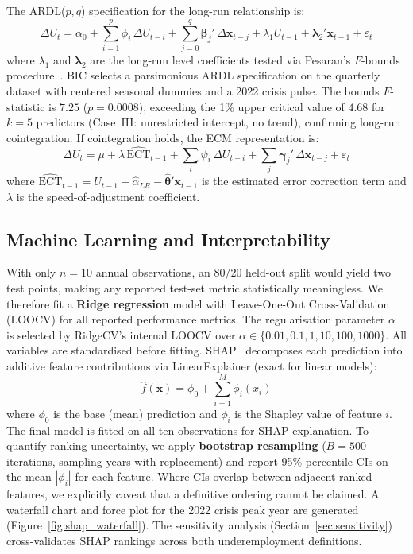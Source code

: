 \documentclass[sigconf]{acmart}
\begin{document}
The ARDL($p,q$) specification for the long-run relationship is:
%
\begin{equation}
  \Delta U_t = \alpha_0
    + \sum_{i=1}^{p}\phi_i\,\Delta U_{t-i}
    + \sum_{j=0}^{q}\boldsymbol{\beta}_j'\,\Delta\mathbf{x}_{t-j}
    + \lambda_1 U_{t-1}
    + \boldsymbol{\lambda}_2'\mathbf{x}_{t-1}
    + \varepsilon_t
  \label{eq:ardl}
\end{equation}
%
where $\lambda_1$ and $\boldsymbol{\lambda}_2$ are the long-run level
coefficients tested via Pesaran's $F$-bounds procedure~\cite{pesaran2001}.
BIC selects a parsimonious ARDL specification on the quarterly dataset
with centered seasonal dummies and a 2022 crisis pulse. The bounds
$F$-statistic is $7.25$ ($p{=}0.0008$),
exceeding the 1\% upper critical value of $4.68$ for $k{=}5$ predictors
(Case~III: unrestricted intercept, no trend), confirming long-run
cointegration. If cointegration holds, the ECM representation is:
%
\begin{equation}
  \Delta U_t = \mu + \lambda\,\widehat{\text{ECT}}_{t-1}
    + \sum_{i}\psi_i\,\Delta U_{t-i}
    + \sum_{j}\boldsymbol{\gamma}_j'\,\Delta\mathbf{x}_{t-j}
    + \varepsilon_t
  \label{eq:ecm}
\end{equation}
%
where $\widehat{\text{ECT}}_{t-1} = U_{t-1} - \hat\alpha_{LR}
- \hat{\boldsymbol{\theta}}'\mathbf{x}_{t-1}$ is the estimated error
correction term and $\lambda$ is the speed-of-adjustment coefficient.

\subsection{Machine Learning and Interpretability}

With only $n{=}10$ annual observations, an 80/20 held-out split would
yield two test points, making any reported test-set metric statistically
meaningless. We therefore fit a \textbf{Ridge regression} model with
Leave-One-Out Cross-Validation (LOOCV) for all reported performance
metrics. The regularisation parameter $\alpha$ is selected by
RidgeCV's internal LOOCV over $\alpha \in \{0.01, 0.1, 1, 10, 100, 1000\}$.
All variables are standardised before fitting. SHAP~\cite{lundberg2017unified}
decomposes each prediction into additive feature contributions via
LinearExplainer (exact for linear models):
%
\begin{equation}
  \hat{f}(\mathbf{x}) = \phi_0 + \sum_{i=1}^{M} \phi_i(x_i)
  \label{eq:shap}
\end{equation}
%
where $\phi_0$ is the base (mean) prediction and $\phi_i$ is the Shapley
value of feature $i$. The final model is fitted on all ten observations
for SHAP explanation. To quantify ranking uncertainty, we apply
\textbf{bootstrap resampling} ($B{=}500$ iterations, sampling years with
replacement) and report 95\% percentile CIs on the mean $|\phi_i|$ for
each feature. Where CIs overlap between adjacent-ranked features, we
explicitly caveat that a definitive ordering cannot be claimed.
A waterfall chart and force plot for the 2022 crisis peak year are
generated (Figure~\ref{fig:shap_waterfall}). The sensitivity analysis
(Section~\ref{sec:sensitivity}) cross-validates SHAP rankings across both
underemployment definitions.
\end{document}
